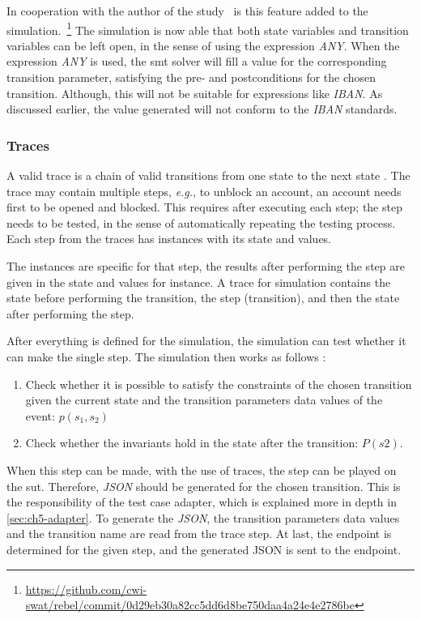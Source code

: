 In cooperation with the author of the study~\cite{stoel_storm_vinju_bosman_2016}
is this feature added to the simulation.~\footnote{\url{https://github.com/cwi-swat/rebel/commit/0d29eb30a82cc5dd6d8be750daa4a24e4e2786be}}
The simulation is now able that both state variables and transition variables
can be left open, in the sense of using the expression \textit{ANY}. When the
expression \textit{ANY} is used, the \gls{smt} solver will fill a value for the
corresponding transition parameter, satisfying the pre- and postconditions for
the chosen transition. Although, this will not be suitable for expressions like
\textit{IBAN}. As discussed earlier, the value generated will not conform to the
\textit{IBAN} standards.

\subsubsection*{Traces}\label{sec:ch5-traces}
A valid trace is a chain of valid transitions from one state to the next state
\cite[p.~5]{stoel_storm_vinju_bosman_2016}. The trace may contain multiple steps,
\textit{e.g.}, to unblock an account, an account needs first to be opened and
blocked. This requires after executing each step; the step needs to be tested,
in the sense of automatically repeating the testing process. Each step from the
traces has instances with its state and values.

The instances are specific
for that step, the results after performing the step are given in the state and
values for instance. A trace for simulation contains the state before
performing the transition, the step (transition), and then the state after
performing the step.

After everything is defined for the simulation, the simulation can test whether
it can make the single step. The simulation then works as follows
\cite[p.~6]{stoel_storm_vinju_bosman_2016}:
\begin{enumerate}
\item Check whether it is possible to satisfy the constraints of the chosen
transition given the current state and the transition parameters data values of
the event: $p(s_{1}, s_{2})$
\item Check whether the invariants hold in the state after the transition:
$P(s2)$.
\end{enumerate}

When this step can be made, with the use of traces, the step can be played on
the \gls{sut}. Therefore, \textit{JSON} should be generated for the chosen
transition. This is the responsibility of the test case adapter, which is
explained more in depth in \autoref{sec:ch5-adapter}. To generate the
\textit{JSON}, the transition parameters data values and
the transition name are read from the trace step. At last, the endpoint is
determined for the given step, and the generated JSON is sent to the endpoint.

